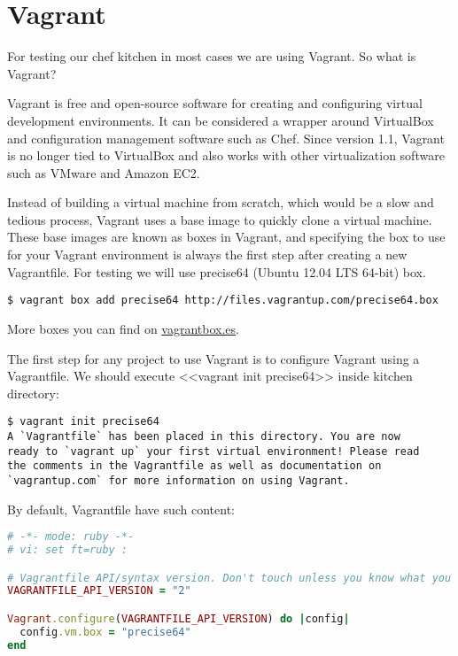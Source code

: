\section{Vagrant}

For testing our chef kitchen in most cases we are using Vagrant. So what is Vagrant?

Vagrant is free and open-source software for creating and configuring virtual development environments. It can be considered a wrapper around VirtualBox and configuration management software such as Chef. Since version 1.1, Vagrant is no longer tied to VirtualBox and also works with other virtualization software such as VMware and Amazon EC2.

Instead of building a virtual machine from scratch, which would be a slow and tedious process, Vagrant uses a base image to quickly clone a virtual machine. These base images are known as boxes in Vagrant, and specifying the box to use for your Vagrant environment is always the first step after creating a new Vagrantfile. For testing we will use precise64 (Ubuntu 12.04 LTS 64-bit) box.

\begin{lstlisting}[label=lst:my-cloud-vagrant1,title=my-cloud/nodes/Vagrantfile]
$ vagrant box add precise64 http://files.vagrantup.com/precise64.box
\end{lstlisting}

More boxes you can find on \href{http://www.vagrantbox.es/}{vagrantbox.es}.

The first step for any project to use Vagrant is to configure Vagrant using a Vagrantfile. We should execute <<vagrant init precise64>> inside kitchen directory:

\begin{lstlisting}[label=lst:my-cloud-vagrant2,title=my-cloud/nodes/Vagrantfile]
$ vagrant init precise64
A `Vagrantfile` has been placed in this directory. You are now
ready to `vagrant up` your first virtual environment! Please read
the comments in the Vagrantfile as well as documentation on
`vagrantup.com` for more information on using Vagrant.
\end{lstlisting}

By default, Vagrantfile have such content:

\begin{lstlisting}[language=Ruby,label=lst:my-cloud-vagrant3,title=my-cloud/nodes/Vagrantfile]
# -*- mode: ruby -*-
# vi: set ft=ruby :

# Vagrantfile API/syntax version. Don't touch unless you know what you're doing!
VAGRANTFILE_API_VERSION = "2"

Vagrant.configure(VAGRANTFILE_API_VERSION) do |config|
  config.vm.box = "precise64"
end
\end{lstlisting}

